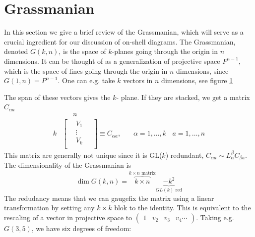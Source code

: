 \documentclass[letter,11pt]{article}
\begin{document}
\section{Grassmanian}
In this section we give a brief review of the Grassmanian, which will serve as a crucial ingredient for our discussion of on-shell diagrams.
The Grassmanian, denoted $G(k,n)$, is the space of $k$-planes going through the origin in $n$ dimensions. It can be thought of as a generalization of projective space $P^{n-1}$, which is the space of lines going through the origin in $n$-dimensions, since $G(1,n)=P^{n-1}$. One can e.g. take $k$ vectors in $n$ dimensions, see figure \ref{fig:1}
\begin{figure}[H]
	\centering
{}
\caption{}
\label{fig:1}
\end{figure}
The span of these vectors gives the $k$- plane. If they are stacked, we get a matrix $C_{\alpha a}$
\begin{equation}
\begin{aligned}
	&~~~~~~~n\\
	k&
\begin{bmatrix}
	~~~~V_1~~~~~\\
	~~~~\vdots ~~~~~\\
	~~~~V_k~~~~~\\
\end{bmatrix}\equiv C_{\alpha a},~~~~~~~~\alpha=1,\dots,k~~~~a=1,\dots,n
\end{aligned}
\end{equation}
This matrix are generally not unique since it is GL($k$) redundant, $
C_{\alpha a}\sim L^{\beta}_\alpha C_{\beta a}$.
The dimensionality of the Grassmanian is 
\begin{equation}
\dim G(k,n)=\overbrace{k\times n}^{k\times n \text{ matrix}}\underbrace{-k^2}_{GL(k) \text{ red}}
\end{equation}
The redudancy means that we can gaugefix the matrix using a linear transformation by setting any $k\times k$ blok to the identity. This is equivalent to the rescaling of a vector in projective space to $\begin{pmatrix}
1 & v_2 & v_3 & v_4 \cdots
\end{pmatrix}$. Taking e.g. $G(3,5)$, we have six degrees of freedom:
\end{document}
